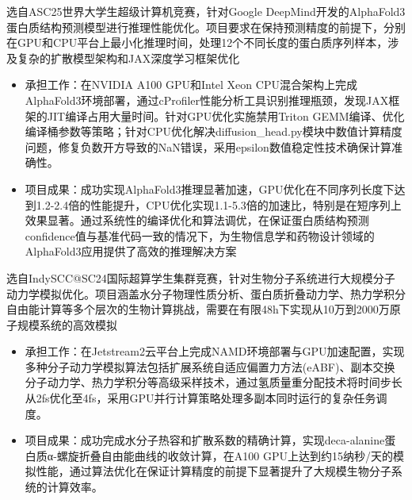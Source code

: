 \documentclass{resume}
\begin{document}
选自ASC25世界大学生超级计算机竞赛，针对Google DeepMind开发的AlphaFold3蛋白质结构预测模型进行推理性能优化。项目要求在保持预测精度的前提下，分别在GPU和CPU平台上最小化推理时间，处理12个不同长度的蛋白质序列样本，涉及复杂的扩散模型架构和JAX深度学习框架优化
\begin{itemize}
  \item 承担工作：在NVIDIA A100 GPU和Intel Xeon CPU混合架构上完成AlphaFold3环境部署，通过cProfiler性能分析工具识别推理瓶颈，发现JAX框架的JIT编译占用大量时间。针对GPU优化实施禁用Triton GEMM编译、优化编译桶参数等策略；针对CPU优化解决diffusion\_head.py模块中数值计算精度问题，修复负数开方导致的NaN错误，采用epsilon数值稳定性技术确保计算准确性。
  \item 项目成果：成功实现AlphaFold3推理显著加速，GPU优化在不同序列长度下达到1.2-2.4倍的性能提升，CPU优化实现1.1-5.3倍的加速比，特别是在短序列上效果显著。通过系统性的编译优化和算法调优，在保证蛋白质结构预测confidence值与基准代码一致的情况下，为生物信息学和药物设计领域的AlphaFold3应用提供了高效的推理解决方案
\end{itemize}

选自IndySCC@SC24国际超算学生集群竞赛，针对生物分子系统进行大规模分子动力学模拟优化。项目涵盖水分子物理性质分析、蛋白质折叠动力学、热力学积分自由能计算等多个层次的生物计算挑战，需要在有限48h下实现从10万到2000万原子规模系统的高效模拟
\begin{itemize}
  \item 承担工作：在Jetstream2云平台上完成NAMD环境部署与GPU加速配置，实现多种分子动力学模拟算法包括扩展系统自适应偏置力方法(eABF)、副本交换分子动力学、热力学积分等高级采样技术，通过氢质量重分配技术将时间步长从2fs优化至4fs，采用GPU并行计算策略处理多副本同时运行的复杂任务调度。
  \item 项目成果：成功完成水分子热容和扩散系数的精确计算，实现deca-alanine蛋白质α-螺旋折叠自由能曲线的收敛计算，在A100 GPU上达到约15纳秒/天的模拟性能，通过算法优化在保证计算精度的前提下显著提升了大规模生物分子系统的计算效率。
\end{itemize}
\end{document}
